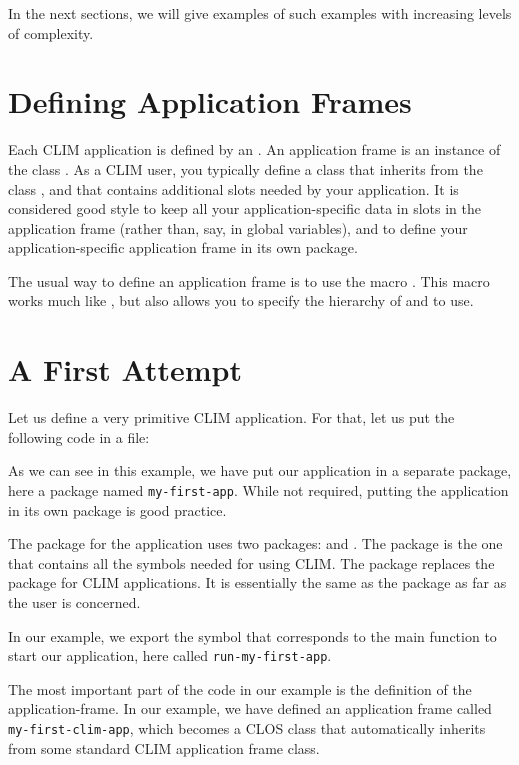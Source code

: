 In the next sections, we will give examples of such examples with
increasing levels of complexity.


\section{Defining Application Frames}

Each CLIM application is defined by an . An application
frame is an instance of the class . As a CLIM user, you
typically define a class that inherits from the class ,
and that contains additional slots needed by your application. It is considered
good style to keep all your application-specific data in slots in the
application frame (rather than, say, in global variables), and to define your
application-specific application frame in its own package.

The usual way to define an application frame is to use the macro
.  This macro works much like
, but also allows you to specify the hierarchy of
 and  to use.

\section{A First Attempt}

Let us define a very primitive CLIM application.  For that, let us put
the following code in a file:



As we can see in this example, we have put our application in a
separate package, here a package named \texttt{my-first-app}. While
not required, putting the application in its own package is good
practice.

The package for the application uses two packages:  and
.  The  package is the one that
contains all the symbols needed for using CLIM.  The
 package replaces the  package
for CLIM applications.  It is essentially the same as the
 package as far as the user is concerned.

In our example, we export the symbol that corresponds to the main
function to start our application, here called
\texttt{run-my-first-app}.

The most important part of the code in our example is the definition
of the application-frame.  In our example, we have defined an
application frame called \texttt{my-first-clim-app}, which becomes a
CLOS class that automatically inherits from some standard CLIM
application frame class.

